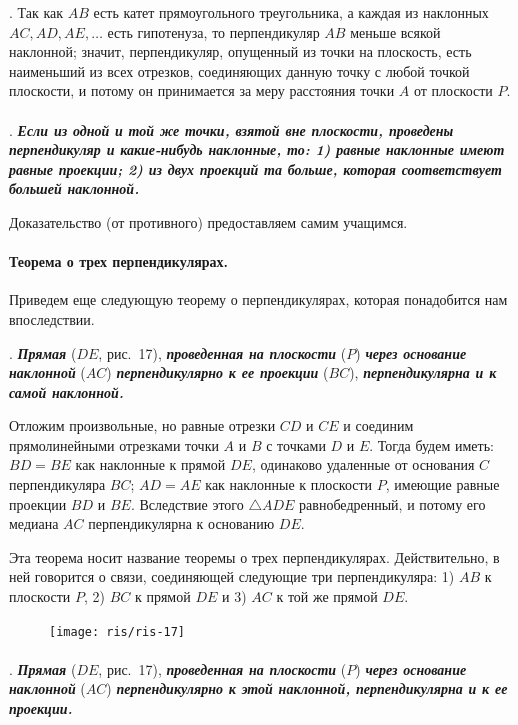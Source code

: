 \documentclass[twoside]{book}
\begin{document}
.
Так как $AB$ есть катет прямоугольного треугольника, а каждая из наклонных $AC, AD, AE,\dots$ есть гипотенуза, то перпендикуляр $AB$ меньше всякой наклонной;
значит, перпендикуляр, опущенный из точки на плоскость, есть наименьший из всех отрезков, соединяющих данную точку с любой точкой плоскости, и потому он принимается за меру расстояния точки $A$ от плоскости $P$.

\paragraph{}\label{1938/s27}
.
\textbf{\emph{Если из одной и той же точки, взятой вне плоскости, проведены перпендикуляр и какие-нибудь наклонные, то: 1) равные наклонные имеют равные проекции;
2) из двух проекций та больше, которая соответствует большей наклонной.}}

Доказательство (от противного) предоставляем самим учащимся.

\paragraph{Теорема о трех перпендикулярах.}\label{1938/s28}
Приведем еще следующую теорему о перпендикулярах, которая понадобится нам впоследствии.

 .
\textbf{\emph{Прямая}} ($DE$, рис.~17), \textbf{\emph{проведенная на плоскости}} ($P$) \textbf{\emph{через основание наклонной}} ($AC$) \textbf{\emph{перпендикулярно к ее проекции}} ($BC$), \textbf{\emph{перпендикулярна и к самой наклонной.}}

Отложим произвольные, но равные отрезки $CD$ и $CE$ и соединим прямолинейными отрезками точки $A$ и $B$ с точками $D$ и $E$.
Тогда будем иметь: $BD=BE$ как наклонные к прямой $DE$, одинаково удаленные от основания $C$ перпендикуляра $BC$;
$AD=AE$ как наклонные к плоскости $P$, имеющие равные проекции $BD$ и $BE$.
Вследствие этого $\triangle ADE$ равнобедренный, и потому его медиана $AC$ перпендикулярна к основанию $DE$.

Эта теорема носит название теоремы о трех перпендикулярах.
Действительно, в ней говорится о связи, соединяющей следующие три перпендикуляра: 1) $AB$ к плоскости $P$, 2) $BC$ к прямой $DE$ и 3) $AC$ к той же прямой $DE$.

\begin{figure}[h!]
\centering
\texttt{[image: ris/ris-17]}
\caption{}
\end{figure}

\paragraph{}\label{1938/s29}
.
\textbf{\emph{Прямая}} ($DE$, рис.~17), \textbf{\emph{проведенная на плоскости}} ($P$) \textbf{\emph{через основание наклонной}} ($AC$) \textbf{\emph{перпендикулярно к этой наклонной, перпендикулярна и к ее проекции.}}
\end{document}
